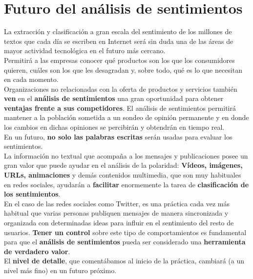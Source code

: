 \documentclass[a4paper,12pt]{report}
\begin{document}
\section{Futuro del análisis de sentimientos} 

La extracción y clasificación a gran escala del sentimiento de los millones de textos que cada día se escriben en Internet será sin duda una de las áreas de mayor actividad tecnológica en el futuro más cercano. 
\vspace{4mm}\\
Permitirá a las empresas conocer qué productos son los que los consumidores quieren, cuáles son los que les desagradan y, sobre todo, qué es lo que necesitan en cada momento.
\vspace{2mm}\\
Organizaciones no relacionadas con la oferta de productos y servicios también \textbf{ven} en el \textbf{análisis de sentimientos} una gran oportunidad para obtener \textbf{ventajas frente a sus competidores}. El análisis de sentimientos permitirá mantener a la población sometida a un sondeo de opinión permanente y en donde los cambios en dichas opiniones se percibirán y obtendrán en tiempo real.
\vspace{2mm}\\
En un futuro, \textbf{no solo las palabras escritas} serán usadas para evaluar los sentimientos. 
\\La información no textual que acompaña a los mensajes y publicaciones posee un gran valor que puede ayudar en el análisis de la polaridad: \textbf{Vídeos, imágenes, URLs, animaciones} y demás contenidos multimedia, que son muy habituales en redes sociales, ayudarán a \textbf{facilitar} enormemente la tarea de \textbf{clasificación de los sentimientos}.
\vspace{2mm}\\
En el caso de las redes sociales como Twitter, es una práctica cada vez más habitual que varias personas publiquen mensajes de manera sincronizada y organizada con determinadas ideas para influir en el sentimiento del resto de usuarios. \textbf{Tener un control} sobre este tipo de comportamientos es fundamental para que el \textbf{análisis de sentimientos} pueda ser considerado una \textbf{herramienta de verdadero valor}. 
\vspace{2mm}\\
El \textbf{nivel de detalle}, que comentábamos al inicio de la práctica, cambiará (a un nivel más fino) en un futuro próximo.
\vspace{4mm}\\
\end{document}
